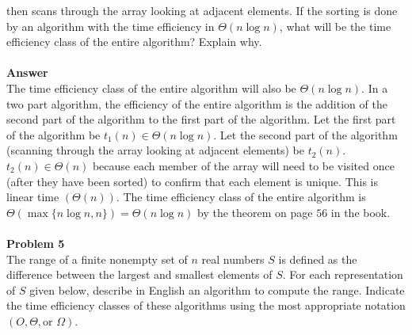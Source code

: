 \documentclass[11pt]{article}
\begin{document}
then scans through the array looking at adjacent elements. If the sorting is
done by an algorithm with the time efficiency in $\Theta(n \log n)$, what will
be the time efficiency class of the entire algorithm? Explain why.\\ 
\\
\noindent\textbf{Answer}\\
The time efficiency class of the entire algorithm will also be $\Theta(n \log
n)$. In a two part algorithm, the efficiency of the entire algorithm is the 
addition of the second part of the algorithm to the first part of the 
algorithm. Let the first part of the algorithm be $t_1(n) \in \Theta(n \log
n)$. Let the second part of the algorithm (scanning through the array looking
at adjacent elements) be $t_2(n)$. $t_2(n) \in \Theta(n)$
because each member of the array will need to be visited once (after they
have been sorted) to confirm that each element is unique. This is linear
time $(\Theta(n))$. The time efficiency class of the entire algorithm is
$\Theta(\max \{n \log n, n\}) = \Theta(n \log n)$ by the theorem on page $56$
in the book. \\
\\ 
\noindent\textbf{Problem 5}\\
The range of a finite nonempty set of $n$ real numbers $S$ is defined as the
difference between the largest and smallest elements of $S$. For each
representation of $S$ given below, describe in English an algorithm to compute
the range. Indicate the time efficiency classes of these algorithms using the
most appropriate notation $(O, \Theta, \text{or } \Omega)$. 
\end{document}
